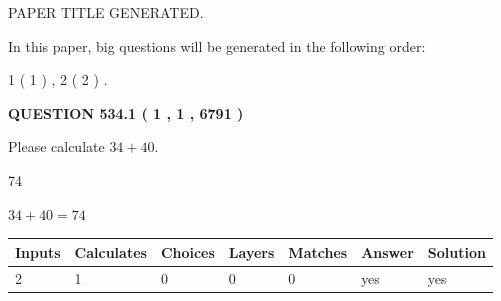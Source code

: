 \documentclass[12pt]{article}
\begin{document}
   
   
   
   
   
 \vspace{0.2in}
 
 
 
 
   
   
 PAPER TITLE GENERATED.
   
   
   
\vspace{0.2in}
   
In this paper, big questions will be generated in the following order: 
   
   
   1 ( 1 )
 ,
   2 ( 2 )
 .
  
\vspace{0.2in}
  
{\textbf{\Large{QUESTION
534.1 
 ( 1 , 1 , 6791 )
}}}
  
  
 
Please calculate $ %
34 +  %
40 $.
 
 
 
\noindent{}
 
 

74
 
 
\noindent{}
 
 

 
 
 
\noindent{}
 
 

$ %
34 +  %
40=   %
74$
 
 
\noindent{}
 
 

 
   
   
   
   
\noindent\begin{tabular}{|l|l|l|l|l|l|l|}
 \hline
Inputs & Calculates & Choices & Layers & Matches & Answer & Solution \\ \hline
 2  & 
 1  & 
 0
  & 
 0  & 
 0  & 
  yes & 
  yes 
  \\ \hline
 \end{tabular}
   
   
   
   
\noindent{}
   
\end{document}
